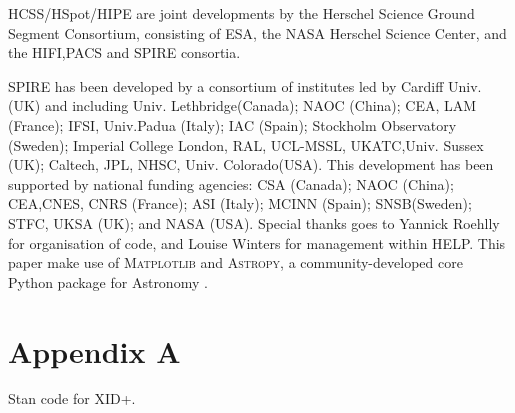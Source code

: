 \documentclass[useAMS,usenatbib]{mnras}
\begin{document}
HCSS/HSpot/HIPE are joint developments by the Herschel Science Ground Segment Consortium, consisting of ESA, the NASA Herschel Science Center, and the HIFI,PACS and SPIRE consortia.

SPIRE has been developed by a consortium of institutes led by Cardiff Univ. (UK) and including Univ. Lethbridge(Canada); NAOC (China); CEA, LAM (France); IFSI, Univ.Padua (Italy); IAC (Spain); Stockholm Observatory (Sweden); Imperial College London, RAL, UCL-MSSL, UKATC,Univ.  Sussex  (UK);  Caltech, JPL, NHSC, Univ.  Colorado(USA).  This development has been supported by national funding agencies: CSA (Canada); NAOC (China);  CEA,CNES, CNRS (France); ASI (Italy); MCINN (Spain); SNSB(Sweden); STFC, UKSA (UK); and NASA (USA).
Special thanks goes to Yannick Roehlly for organisation of code, and Louise Winters for management within HELP. This paper make use of \textsc{Matplotlib} \citep{Hunter:2007} and \textsc{Astropy}, a community-developed core Python package for Astronomy \citep{Astropy-Collaboration:2013}. 

%
%

\appendix
\renewcommand{\thefigure}{A\arabic{figure}}

\setcounter{figure}{0}
\section*{Appendix A}\label{Stan_model}
\onecolumn
Stan code for XID+.

\clearpage 
\end{document}
